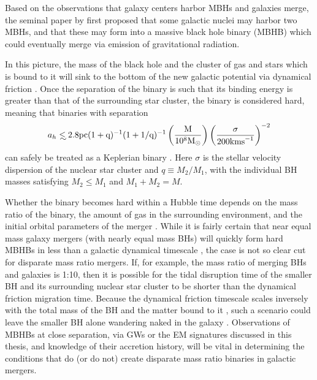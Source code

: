 Based on the observations that galaxy centers harbor MBHs and galaxies merge,
the seminal paper by \cite{Begel:Blan:Rees:1980} first proposed that some
galactic nuclei may harbor two MBHs, and that these may form into a massive
black hole binary (MBHB) which could eventually merge via emission of
gravitational radiation.

In this picture, the mass of the black hole and the cluster of gas and stars
which is bound to it will sink to the bottom of the new galactic potential via
dynamical friction \citep{Begel:Blan:Rees:1980, Chandrasekhar:1943}. Once the
separation of the binary is such that its binding energy is
greater than that of the surrounding star cluster, the binary is considered
hard, meaning that binaries with separation
\begin{equation}
a_h \lsim 2.8 \rm{pc} (1+q)^{-1} (1+1/q)^{-1}  \left( \frac{M}{10^8 \Msun} \right)  
\left( \frac{\sigma}{200 \rm{km s}^{-1}} \right)^{-2}
\end{equation}
can safely be treated as a Keplerian binary
\citep[\emph{e.g.}][]{MerrittMilos:2005}. Here $\sigma$ is the stellar
velocity dispersion of the nuclear star cluster and $q\equiv M_2/M_1$, with
the individual BH masses satisfying $M_2 \leq M_1$ and $M_1+M_2=M$.

Whether the binary becomes hard within a Hubble time depends on the mass ratio
of the binary, the amount of gas in the surrounding environment, and the
initial orbital parameters of the merger \citep{Mayer:2013:MBHBGasRev}. While it is
fairly certain that near equal mass galaxy mergers (with nearly equal mass
BHs) will quickly form hard MBHBs in less than a galactic dynamical timescale
\citep{Mayer:2007, Chapon:2013}, the case is not so clear cut for disparate
mass ratio mergers. If, for example, the mass ratio of merging BHs and
galaxies is 1:10, then it is possible for the tidal disruption time of the
smaller BH and its surrounding nuclear star cluster to be shorter than the
dynamical friction migration time. Because the dynamical friction timescale
scales inversely with the total mass of the BH and the matter bound to it
\citep{Chandrasekhar:1943, ColpiDotti:2009}, such a scenario could leave the smaller BH
alone wandering naked in the galaxy \citep{Callegari:2011, Mayer:2013}.
Observations of MBHBs at close separation, via GWs or the EM signatures
discussed in this thesis, and knowledge of their accretion history, will be
vital in determining the conditions that do (or do not) create disparate mass
ratio binaries in galactic mergers.

